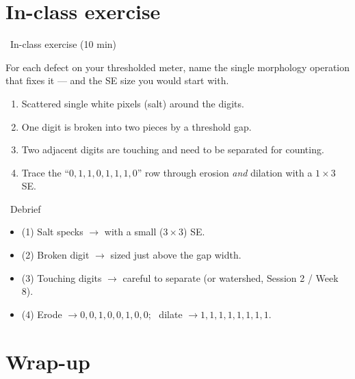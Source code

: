\documentclass[10pt,aspectratio=169]{beamer}
\begin{document}
\section{In-class exercise}

\begin{frame}{\faPen~In-class exercise (10 min)}
  \begin{infobox}
    For each defect on your thresholded meter, name the single morphology operation that fixes it — and the SE size you would start with.
  \end{infobox}
  \begin{enumerate}
    \item Scattered single white pixels (salt) around the digits.
    \item One digit is broken into two pieces by a threshold gap.
    \item Two adjacent digits are touching and need to be separated for counting.
    \item Trace the ``$0,1,1,0,1,1,1,0$'' row through erosion \emph{and} dilation with a $1\times3$ SE.
  \end{enumerate}
\end{frame}

\begin{frame}{\faPen~Debrief}
  \begin{itemize}
    \item (1) Salt specks $\rightarrow$  with a small ($3\times3$) SE.
    \item (2) Broken digit $\rightarrow$  sized just above the gap width.
    \item (3) Touching digits $\rightarrow$ careful  to separate (or watershed, Session 2 / Week 8).
    \item (4) Erode $\to 0,0,1,0,0,1,0,0$; \ dilate $\to 1,1,1,1,1,1,1,1$.
  \end{itemize}
\end{frame}

\section{Wrap-up}
\end{document}
